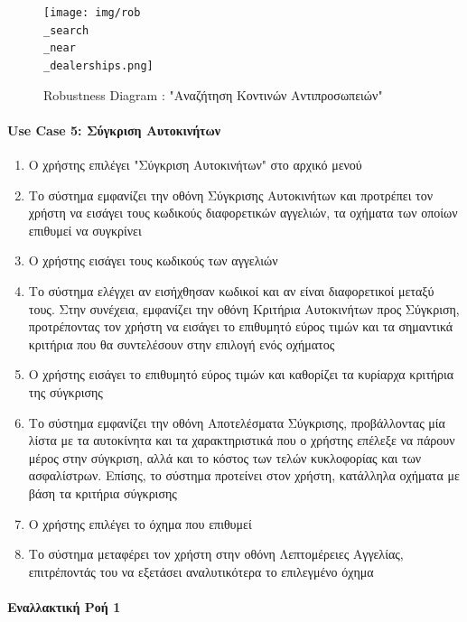 \documentclass{../ol-softwaremanual}
\begin{document}
	
	\begin{figure}[htbp!]
		\texttt{[image: img/rob\\\_search\\\_near\\\_dealerships.png]}
		\caption{\en Robustness Diagram : "\gr Αναζήτηση Κοντινών Αντιπροσωπειών\en"\gr}
	\end{figure}
	
	\newpage
	
	\centering
	
	\paragraph{\en Use Case 5: \gr Σύγκριση Αυτοκινήτων}
	\begin{enumerate}
		\item Ο χρήστης επιλέγει \en"\gr Σύγκριση Αυτοκινήτων\en" \gr στο αρχικό μενού
		\item Το σύστημα εμφανίζει την οθόνη Σύγκρισης Αυτοκινήτων και προτρέπει τον χρήστη να εισάγει τους κωδικούς διαφορετικών αγγελιών, τα οχήματα των οποίων επιθυμεί να συγκρίνει
		\item Ο χρήστης εισάγει τους κωδικούς των αγγελιών
		\item Το σύστημα ελέγχει αν εισήχθησαν κωδικοί και αν είναι διαφορετικοί μεταξύ τους. Στην συνέχεια, εμφανίζει την οθόνη Κριτήρια Αυτοκινήτων προς Σύγκριση, προτρέποντας τον χρήστη να εισάγει το επιθυμητό εύρος τιμών και τα σημαντικά κριτήρια που θα συντελέσουν στην επιλογή ενός οχήματος
		\item Ο χρήστης εισάγει το επιθυμητό εύρος τιμών και καθορίζει τα κυρίαρχα κριτήρια της σύγκρισης
		\item Το σύστημα εμφανίζει την οθόνη Αποτελέσματα Σύγκρισης, προβάλλοντας μία λίστα με τα αυτοκίνητα και τα χαρακτηριστικά που ο χρήστης επέλεξε να πάρουν μέρος στην σύγκριση, αλλά και το κόστος των τελών κυκλοφορίας και των ασφαλίστρων. Επίσης, το σύστημα προτείνει στον χρήστη, κατάλληλα οχήματα με βάση τα κριτήρια σύγκρισης
		\item Ο χρήστης επιλέγει το όχημα που επιθυμεί
		\item Το σύστημα μεταφέρει τον χρήστη στην οθόνη Λεπτομέρειες Αγγελίας, επιτρέποντάς του να εξετάσει αναλυτικότερα το επιλεγμένο όχημα
	\end{enumerate}
	
	\paragraph{Εναλλακτική Ροή 1}
	
\end{document}
